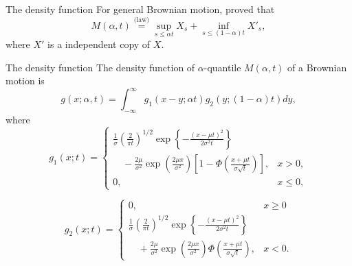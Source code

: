 \documentclass[cjk,10pt]{beamer}
\def\eqlaw{{\stackrel{\text{(law)}}{=}}}
\begin{document}
\begin{frame}{The density function}
For general Brownian motion, \cite{Dassios1995} proved that
\begin{equation}\label{eq:Dassios}
M(\alpha, t) \eqlaw \sup_{s \leq \alpha t} X_s + \inf_{s\leq (1-\alpha)t} X'_s ,
\end{equation}
where $X'$ is a independent copy of $X$.
\end{frame}


\begin{frame}{The density function}
The density function of $\alpha$-quantile $M(\alpha,t)$ of a Brownian motion is 
\begin{equation}\label{eq:fulldensity}
g(x; \alpha , t) = \int^{\infty}_{-\infty} g_1 (x-y; \alpha t) g_2 (y; (1-\alpha) t)dy ,
\end{equation}
where
\begin{equation}
g_1 (x;t) = \begin{cases}
\displaystyle\frac{1}{\sigma}\left({\frac{2}{\pi t}}\right)^{1/2}\exp\left\{-\frac{(x-\mu t)^2}{2\sigma ^2 t}\right\} \\
\displaystyle\quad - \frac{2\mu}{\sigma ^2} \exp\left(\frac{2\mu x}{\sigma ^2}\right)\left[1- \Phi \left(\frac{x+\mu t}{\sigma \sqrt{t}}\right)\right], & x > 0 ,\\
0 , & x  \leq 0 ,
\end{cases}
\end{equation}

\begin{equation}
g_2 (x;t) = \begin{cases}
0, & x \geq 0 \\
\displaystyle\frac{1}{\sigma}\left({\frac{2}{\pi t}}\right)^{1/2}\exp\left\{-\frac{(x-\mu t)^2}{2\sigma ^2 t}\right\} \\
\displaystyle\quad + \frac{2\mu}{\sigma ^2} \exp\left(\frac{2\mu x}{\sigma ^2}\right) \Phi \left(\frac{x+\mu t}{\sigma \sqrt{t}}\right) , & x < 0.
\end{cases}
\end{equation}
\end{frame}
\end{document}
